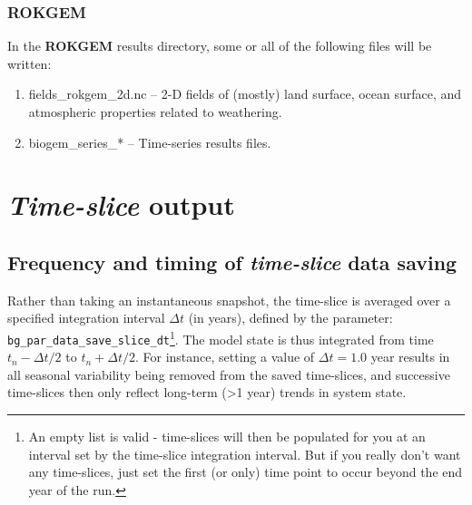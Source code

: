 \documentclass[11pt,fleqn]{book} %
\begin{document}
\subsubsection{ROKGEM}

\noindent In the \textbf{ROKGEM} results directory, some or all of the following files will be written:

\begin{enumerate}

\vspace{1mm}\item \textsf{\footnotesize fields\_rokgem\_2d.nc} -- 2-D fields of (mostly) land surface, ocean surface, and atmospheric properties related to weathering.

\vspace{1mm}\item \textsf{\footnotesize biogem\_series\_*} -- Time-series results files.

\end{enumerate}\vspace{2mm}


\newpage


\section{\textit{Time-slice} output}


\subsection{Frequency and timing of \textit{time-slice} data saving}

Rather than taking an instantaneous snapshot, the time-slice is averaged over a specified integration interval \begin{math}\Delta t\end{math} (in years), defined by the parameter: \texttt{bg\_par\_data\_save\_slice\_dt}\footnote{An empty list is valid - time-slices will then be populated for you at an interval set by the time-slice integration interval. But if you really don't want any time-slices, just set the first (or only) time point to occur beyond the end year of the run.}. The model state is thus integrated from time \begin{math}t_{n} - \Delta t/2\end{math} to \begin{math}t_{n} + \Delta t/2\end{math}. For instance, setting a value of \begin{math}\Delta t = 1.0\end{math} year results in all seasonal variability being removed from the saved time-slices, and successive time-slices then only reflect long-term (\textgreater 1 year) trends in system state.
\end{document}
